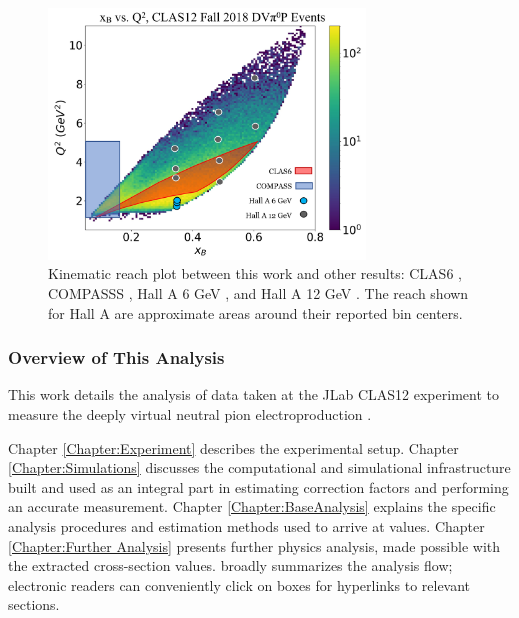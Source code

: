      
        \begin{figure}[H]
            \centering
            \includegraphics[width=0.75\textwidth]{Chapters/Ch1-Intro/Ch1-Sec2-GPDs-DVMP/pics/kinematic_overlap.png}
            \caption[Kinematic Reach Comparison]{Kinematic reach plot between this work and other results:  CLAS6 \parencite{Bedlinskiy2014ExclusiveCLAS}, COMPASSS \parencite{Alexeev2020MeasurementProton}, Hall A 6 GeV \parencite{Fuchey2011ExclusiveRegime}, and Hall A 12 GeV \parencite{Dlamini2021DeepRegime}. The reach shown for Hall A are approximate areas around their reported bin centers. }
            \label{fig:kinematicreach}
        \end{figure}

        \subsubsection*{Overview of This Analysis}\label{sec:anaflow}
    
    
        This work details the analysis of data taken at the JLab CLAS12 experiment to measure the deeply virtual neutral pion electroproduction \xsec.
        
        
        Chapter \ref{Chapter:Experiment} describes the experimental setup. Chapter \ref{Chapter:Simulations} discusses the computational and simulational infrastructure built and used as an integral part in estimating correction factors and performing an accurate measurement. Chapter \ref{Chapter:BaseAnalysis} explains the specific analysis procedures and estimation methods used to arrive at \xsec values. Chapter \ref{Chapter:Further Analysis} presents further physics analysis, made possible with the extracted cross-section values.  broadly summarizes the analysis flow; electronic readers can conveniently click on boxes for hyperlinks to relevant sections. 

